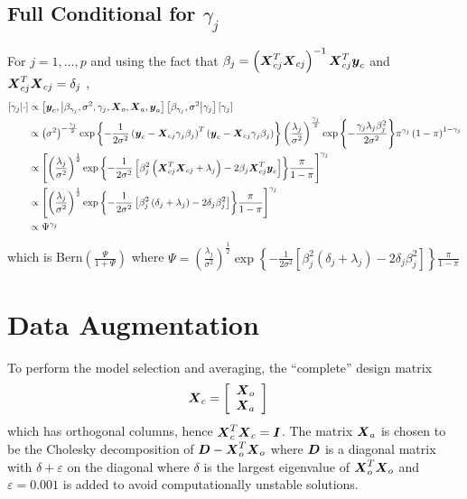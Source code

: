 \documentclass[fleqn]{article}
\def\bm#1{\mbox{\boldmath $#1$}}
\begin{document}
\subsection{Full Conditional for $\gamma_j$}
%
For $j = 1, \ldots, p$ and using the fact that $\beta_j = \left( \bm{X}_{c j}^T \bm{X}_{c j} \right)^{ - 1} \bm{X}_{c j}^T \bm{y}_c$ and $\bm{X}_{c j}^T \bm{X}_{c j} = \delta_j$ 
,
%
\begin{align*}
%
\left[ \gamma_j \middle| \cdot \right] & \propto \left[ \bm{y}_c, \middle| \beta_{\gamma_j}, \sigma^2, \gamma_j, \bm{X}_o, \bm{X}_a, \bm{y}_a \right] \left[ \beta_{\gamma_j}, \sigma^2 \middle| \gamma_j \right] \left[ \gamma_j \right] \\
%
& \propto \left( \sigma^2 \right)^{ - \frac{\gamma_j} {2}} \exp{ \left\{ - \frac{1} {2 \sigma^2} \left( \bm{y}_c - \bm{X}_{c j} \gamma_j \beta_j \right)^T \left( \bm{y}_c - \bm{X}_{c j} \gamma_j \beta_j \right) \right\} } \left( \frac{\lambda_j} {\sigma^2} \right)^{ \frac{\gamma_j} {2} } \exp{ \left\{ - \frac{\gamma_j \lambda_j \beta_j^2} {2 \sigma^2} \right\} } \pi^{\gamma_j} \left( 1 - \pi \right)^{1 - \gamma_j} \\
%
& \propto \left[ \left( \frac{\lambda_j} {\sigma^2} \right)^{ \frac{1} {2} } \exp{ \left\{ - \frac{1} {2 \sigma^2} \left[ \beta_j^2 \left( \bm{X}_{c j}^T \bm{X}_{c j} + \lambda_j \right) - 2 \beta_j \bm{X}_{c j}^T \bm{y}_c \right] \right\} } \frac{\pi} {1 - \pi }\right]^{\gamma_j} \\
%
& \propto \left[ \left( \frac{\lambda_j} {\sigma^2} \right)^{ \frac{1} {2} } \exp{ \left\{ - \frac{1} {2 \sigma^2} \left[ \beta_j^2 \left( \delta_j + \lambda_j \right) - 2 \delta_j \beta_j^2 \right] \right\} } \frac{\pi} {1 - \pi } \right]^{\gamma_j} \\
%
& \propto \Psi^{\gamma_j}
%
\end{align*}
%
which is Bern$\left( \frac{\Psi} {1 + \Psi} \right)$ where $\Psi =  \left( \frac{\lambda_j} {\sigma^2} \right)^{ \frac{1} {2} } \exp{ \left\{ - \frac{1} {2 \sigma^2} \left[ \beta_j^2 \left( \delta_j + \lambda_j \right) - 2 \delta_j \beta_j^2 \right] \right\} } \frac{\pi} {1 - \pi }$
%
\section{Data Augmentation}
To perform the model selection and averaging, the ``complete'' design matrix
%
\begin{align*}
%
\bm{X}_c & = \left[ \begin{array}{c} \bm{X}_o \\ \bm{X}_a \end{array} \right]
%
\end{align*}
%
which has orthogonal columns, hence $\bm{X}_c^T \bm{X}_c = \bm{I}$. The matrix $\bm{X}_a$ is chosen to be the Cholesky decomposition of $\bm{D} - \bm{X}_o^T \bm{X}_o$ where $\bm{D}$ is a diagonal matrix with $\delta + \varepsilon$ on the diagonal where $\delta$ is the largest eigenvalue of $\bm{X}_o^T \bm{X}_o$ and $\varepsilon = 0.001$ is added to avoid computationally unstable solutions.
\end{document}
